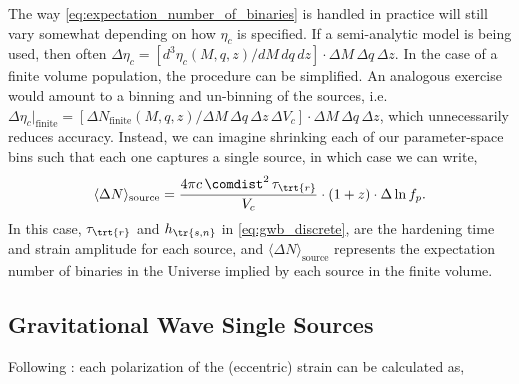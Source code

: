 \documentclass[10pt, oneside, onecolumn]{article}   	%
\newcommand{\hsn}{h_\tr{s,n}}
\newcommand{\thard}{\tau_\trt{r}}
\newcommand{\ndens}{\eta_c}
\begin{document}
                The way \eqref{eq:expectation_number_of_binaries} is handled in practice will still vary somewhat depending on how $\ndens$ is specified.  If a semi-analytic model is being used, then often
                $\Delta \ndens = \left[ d^3 \ndens(M,q,z) / dM \, dq \, dz \right] \cdot \Delta M \, \Delta q \, \Delta z$.  In the case of a finite volume population, the procedure can be simplified.  An analogous exercise would amount to a binning and un-binning of the sources, i.e.~$\Delta \ndens \big|_\textrm{finite} = \left[ \Delta N_\textrm{finite}(M,q,z) / \Delta M \, \Delta q \, \Delta z \, \Delta V_c \right] \cdot \Delta M \, \Delta q \, \Delta z$, which unnecessarily reduces accuracy.  Instead, we can imagine shrinking each of our parameter-space bins such that each one captures a single source, in which case we can write,
                \begin{equation}
                    \label{eq:expectation_number_of_single_binary}
                    \langle \Delta N \rangle_\textrm{source} = \frac{4\pi c \, \comdist^2 \, \thard}{V_c} \cdot (1+z) \cdot \Delta \ln f_p.
                \end{equation}
                In this case, $\thard$ and $\hsn$ in \eqref{eq:gwb_discrete}, are the hardening time and strain amplitude for each source, and $\langle \Delta N \rangle_\textrm{source}$ represents the expectation number of binaries in the Universe implied by each source in the finite volume.



    \subsection{Gravitational Wave Single Sources}
        \label{sec:gw_singles_calc}

        Following \citet{taylor201505}: each polarization of the (eccentric) strain can be calculated as,
\end{document}
